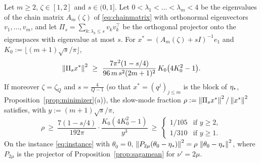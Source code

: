 \begin{lemma}
\label{lem:overlap}
Let $m\ge2$, $\zeta\in[1,2]$ and $s\in(0,1]$. Let $0<\lambda_1<\dots<\lambda_m<4$ be the eigenvalues of the chain matrix $A_m(\zeta)$ of \eqref{eq:chainmatrix} with orthonormal eigenvectors $v_1,\dots,v_m$, and let $\Pi_s=\sum_{k:\lambda_k\le s}v_kv_k^\top$ be the orthogonal projector onto the eigenspaces with eigenvalue at most $s$. For $x^\ast=(A_m(\zeta)+sI)^{-1}e_1$ and $K_0:=\lfloor(m+1)\sqrt s/\pi\rfloor$,
\begin{equation}
\label{ineq:slowmass}
\norm{\Pi_sx^\ast}^2\ \ge\ \frac{7\pi^2(1-s/4)}{96\,m\,s^2(2m+1)^2}\,K_0\big(4K_0^2-1\big).
\end{equation}
If moreover $\zeta=\zeta_Q$ and $s=\frac4{Q-1}$ (so that $x^\ast=(q^j)_{j\le m}$ is the block of $\eta_\ast$, Proposition~\ref{prop:minimizer}(a)), the slow-mode fraction $\rho:=\left\|\Pi_sx^\ast\right\|^2/\left\|x^\ast\right\|^2$ satisfies, with $y:=(m+1)\sqrt s/\pi$,
\begin{equation}
\label{ineq:rho}
\rho\ \ge\ \frac{7(1-s/4)}{192\pi}\cdot\frac{K_0(4K_0^2-1)}{y^3}\ \ge\ \begin{cases}1/105&\text{if }y\ge2,\\ 1/310&\text{if }y\ge1.\end{cases}
\end{equation}
On the instance \eqref{eq:instance} with $\theta_0=0$, $\left\|P_{2\mu}(\theta_0-\eta_\ast)\right\|^2=\rho\,\left\|\theta_0-\eta_\ast\right\|^2$, where $P_{2\mu}$ is the projector of Proposition~\ref{prop:sagamean} for $\nu'=2\mu$.
\end{lemma}

